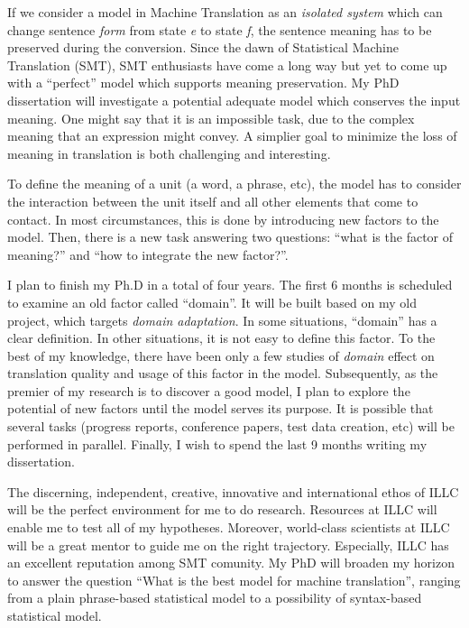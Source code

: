 \documentclass[a4paper, 12pt]{scrartcl}
\begin{document}

If we consider a model in Machine Translation as an \emph{isolated system} which can change sentence \emph{form} from state \emph{e} to state \emph{f}, 
the sentence meaning has to be preserved during the conversion. 
Since the dawn of Statistical Machine Translation (SMT), SMT enthusiasts have come a long way but yet to come up with a ``perfect'' model which supports meaning preservation.
My PhD dissertation will investigate a potential adequate model which conserves 
the input meaning. 
One might say that it is an impossible task, due to the complex meaning that an expression might convey. 
A simplier goal to minimize the
loss of meaning in translation is both challenging and interesting. 


To define the meaning of a unit (a word, a phrase, etc), the model has to consider the interaction between the unit itself and all other elements that come to contact. 
In most circumstances, this is done by introducing new factors to the model.
Then, there is a new task answering two questions: ``what is the factor of meaning?'' and ``how to integrate the new factor?''.

I plan to finish my Ph.D in a total of four years. 
The first 6 months is scheduled to examine an old factor called ``domain''. 
It will be built based on my old project, which targets \emph{domain adaptation}. 
In some situations, ``domain'' has a clear definition. In other situations, it is not easy to define this factor. 
To the best of my knowledge, there have been only a few studies of \emph{domain} effect on translation quality and usage of this factor in the model.
Subsequently, as the premier of my research is to discover a good model,
I plan to explore the potential of new factors until the model serves its purpose.
It is possible that several tasks (progress reports, conference papers, test data creation, etc) will be performed in parallel. 
Finally, I wish to spend the last 9 months writing my dissertation.

The discerning, independent, creative, innovative and international ethos of ILLC will be the perfect environment for me to do research.
Resources at ILLC will enable me to test all of my hypotheses. 
Moreover, world-class scientists at ILLC will be a great mentor to guide me on the right trajectory.
Especially, ILLC has an excellent reputation among SMT comunity.
My PhD will broaden my horizon to answer the question ``What is the best model for machine translation'', ranging from a plain phrase-based statistical model to a possibility of syntax-based statistical model. 
\end{document}
